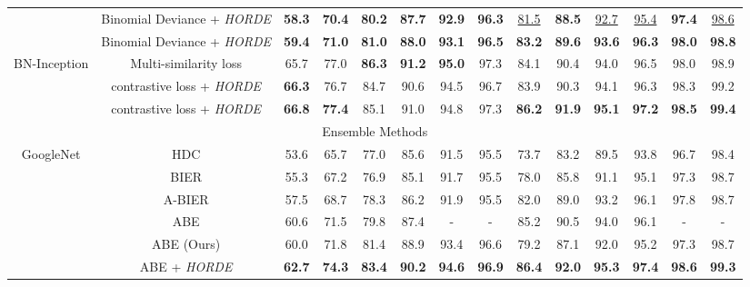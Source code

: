 \documentclass[10pt,twocolumn,letterpaper]{article}
\def\ourmethod{\textit{HORDE}}
\begin{document}
\begin{table*}[t!]
\begin{center}
\begin{tabular}{|c|c|cccccc|cccccc|}
                 & Binomial Deviance + \ourmethod & \textbf{58.3} &\textbf{ 70.4} & \textbf{80.2 }& \textbf{87.7} & \textbf{92.9} & \textbf{96.3} & \underline{81.5} & \textbf{88.5} & \underline{92.7} & \underline{95.4} & \textbf{97.4} & \underline{98.6} \\
                 & Binomial Deviance + \ourmethod{} & \textbf{59.4} &\textbf{ 71.0} & \textbf{81.0 }& \textbf{88.0} & \textbf{93.1} & \textbf{96.5} & \textbf{83.2} & \textbf{89.6} & \textbf{93.6} & \textbf{96.3} & \textbf{98.0} & \textbf{98.8} \\
                \hline
                \multirow{3}{*}{BN-Inception} & Multi-similarity loss \cite{Wang_2019_CVPR} & 65.7 & 77.0 & \textbf{86.3} & \textbf{91.2} & \textbf{95.0} & 97.3 & 84.1 & 90.4 &94.0 & 96.5 & 98.0 & 98.9 \\
                \cline{2-14}
                 & contrastive loss + \ourmethod & \textbf{66.3} & 76.7 & 84.7 & 90.6 & 94.5 & 96.7 & 83.9 & 90.3 & 94.1 & 96.3 & 98.3 & 99.2 \\
                 & contrastive loss + \ourmethod{} & \textbf{66.8} & \textbf{77.4} & 85.1 & 91.0 & 94.8 & 97.3 & \textbf{86.2} & \textbf{91.9} & \textbf{95.1} & \textbf{97.2} & \textbf{98.5} & \textbf{99.4} \\
                \hline
                \multicolumn{14}{|c|}{Ensemble Methods} \\\hline
                \multirow{7}{*}{GoogleNet} & HDC \cite{Yuan_2017_ICCV} & 53.6 & 65.7 & 77.0 & 85.6 & 91.5 & 95.5 & 73.7 & 83.2 & 89.5 & 93.8 & 96.7 & 98.4 \\
                 & BIER \cite{Opitz_2017_ICCV} & 55.3 & 67.2 & 76.9 & 85.1 & 91.7 & 95.5 & 78.0 & 85.8 & 91.1 & 95.1 & 97.3 & 98.7 \\
                 & A-BIER \cite{Opitz_toap_PAMI} & 57.5 & 68.7 & 78.3 & 86.2 & 91.9 & 95.5 & 82.0 & 89.0 & 93.2 & 96.1 & 97.8 & 98.7 \\
                 & ABE \cite{Kim_2018_ECCV} & 60.6 & 71.5 & 79.8 & 87.4 & - & - & 85.2 & 90.5 & 94.0 & 96.1 & - & - \\
                \cline{2-14}
                 & ABE (Ours) & 60.0 & 71.8 & 81.4 & 88.9 & 93.4 & 96.6 & 79.2 & 87.1 & 92.0 & 95.2 & 97.3 & 98.7 \\
                 & ABE + \ourmethod & \textbf{62.7} & \textbf{74.3} &\textbf{ 83.4} & \textbf{90.2} & \textbf{94.6} & \textbf{96.9} & \textbf{86.4} & \textbf{92.0 }& \textbf{95.3} & \textbf{97.4} &\textbf{ 98.6} & \textbf{99.3} \\

\end{tabular}
\end{center}
\end{table*}
\end{document}
